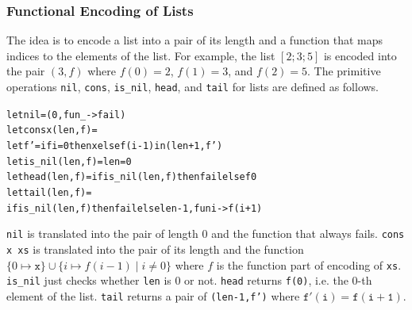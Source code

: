 %
%
%

\subsubsection{Functional Encoding of Lists}
\label{sec:list}

The idea is to encode a list into a pair of its length and a function that
maps indices to the elements of the list.  For example, the list
$[2;3;5]$ is encoded into the pair $(3,f)$ where $f(0) = 2$, $f(1) = 3$, and
$f(2) = 5$.  The primitive operations \texttt{nil}, \texttt{cons},
\texttt{is\_nil}, \texttt{head}, and \texttt{tail} for lists are defined
as follows.
\begin{alltt}
let nil = (0, fun _ -> fail)
let cons x (len,f) =
  let f' = if i = 0 then x else f (i-1) in (len+1, f')
let is_nil (len,f) = len = 0
let head (len,f) = if is_nil (len,f) then fail else f 0
let tail (len,f) =
  if is_nil (len,f) then fail else len-1, fun i -> f (i+1)
\end{alltt}
\texttt{nil} is translated into the pair of length $0$ and the
function that always fails.  \texttt{cons x xs} is translated into the
pair of its length and the function $\{0 \mapsto \mathtt{x}\} \cup \{i \mapsto
f (i-1) \mid i \neq 0\}$ where $f$ is the function part of encoding of
\texttt{xs}.  \texttt{is\_nil} just checks whether \texttt{len} is 0 or not.
\texttt{head} returns \texttt{f(0)}, i.e. the $0$-th
element of the list.  \texttt{tail} returns a pair of
\texttt{(len-1,f')} where $\mathtt{f'(i)} = \mathtt{f(i+1)}$.

